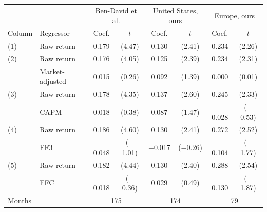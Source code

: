 \begin{tabular}{llcccccc}
\toprule
 & & \multicolumn{2}{c}{Ben-David et al.} & \multicolumn{2}{c}{United States, ours} & \multicolumn{2}{c}{Europe, ours} \\
Column & Regressor & Coef. & $t$ & Coef. & $t$ & Coef. & $t$ \\
\midrule
(1) & Raw return & 0.179 & (4.47) & 0.130 & (2.41) & 0.234 & (2.26) \\
(2) & Raw return & 0.176 & (4.05) & 0.125 & (2.39) & 0.234 & (2.31) \\
 & Market-adjusted & 0.015 & (0.26) & 0.092 & (1.39) & 0.000 & (0.01) \\
(3) & Raw return & 0.178 & (4.35) & 0.137 & (2.60) & 0.245 & (2.33) \\
 & CAPM & 0.018 & (0.38) & 0.087 & (1.47) & $-$0.028 & ($-$0.53) \\
(4) & Raw return & 0.186 & (4.60) & 0.130 & (2.41) & 0.272 & (2.52) \\
 & FF3 & $-$0.048 & ($-$1.01) & $-$0.017 & ($-$0.26) & $-$0.104 & ($-$1.77) \\
(5) & Raw return & 0.182 & (4.44) & 0.130 & (2.40) & 0.288 & (2.54) \\
 & FFC & $-$0.018 & ($-$0.36) & 0.029 & (0.49) & $-$0.130 & ($-$1.87) \\
Months & & \multicolumn{2}{c}{175} & \multicolumn{2}{c}{174} & \multicolumn{2}{c}{79} \\
\bottomrule
\end{tabular}
